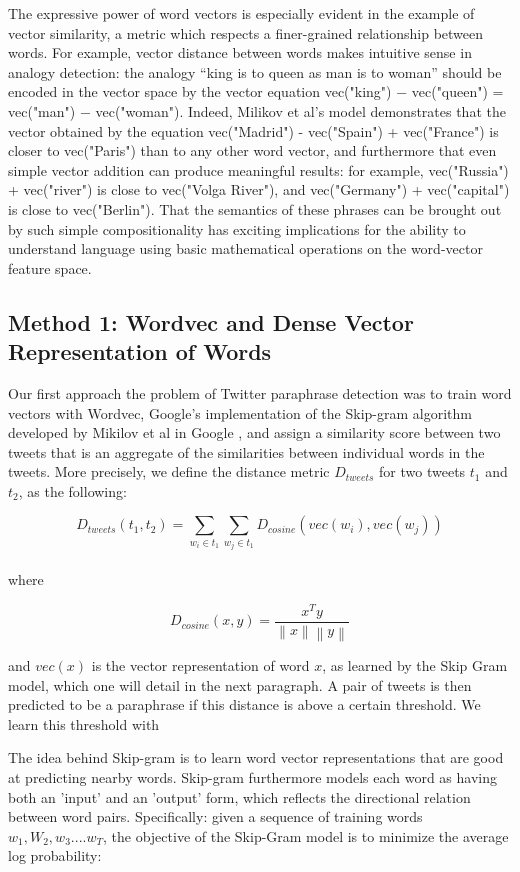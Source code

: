 \documentclass[conference]{IEEEtran}
\begin{document}
The expressive power of word vectors is especially evident in the example of vector similarity, a metric which respects a finer-grained relationship between words. For example, vector distance between words makes intuitive sense in analogy detection: the analogy “king is to queen as man is to woman” should be encoded in the vector space by the vector equation vec("king") − vec("queen") = vec("man") − vec("woman").  Indeed, Milikov et al's model demonstrates that the vector obtained by the equation vec("Madrid") - vec("Spain") + vec("France") is closer to vec("Paris") than to any other word vector, and furthermore that even simple vector addition can produce meaningful results: for example, vec("Russia") + vec("river") is close to vec("Volga River"), and vec("Germany") + vec("capital") is close to vec("Berlin"). That the semantics of these phrases can be brought out by such simple compositionality has exciting implications for the ability to understand language using basic mathematical operations on the word-vector feature space.\\


\subsection{Method 1: Wordvec and Dense Vector Representation of Words}
Our first approach the problem of Twitter paraphrase detection was to train word vectors with Wordvec, Google's implementation of the Skip-gram algorithm developed by Mikilov et al in Google \cite{Mikolov}, and assign a similarity score between two tweets that is an aggregate of the similarities between individual words in the tweets.  More precisely, we define the distance metric $D_{tweets}$ for two tweets $t_1$ and $t_2$, as the following:

$$D_{tweets}(t_1, t_2) = \sum_{w_i \in t_1} \sum_{w_j \in t_1} D_{cosine}(vec(w_i), vec(w_j))$$\\

where

$$D_{cosine}(x, y) = \frac{x^Ty}{\left \| x \right \| \left \|y \right \|}$$

and $vec(x)$ is the vector representation of word $x$, as learned by the Skip Gram model, which one will detail in the next paragraph.  A pair of tweets is then predicted to be a paraphrase if this distance is above a certain threshold.  We learn this threshold with 

The idea behind Skip-gram is to learn word vector representations that are good at predicting nearby words.  Skip-gram furthermore models each word as having both an 'input' and an 'output' form, which reflects the directional relation between word pairs.  Specifically: given a sequence of training words $w_1, W_2, w_3 .... w_T$, the objective of the Skip-Gram model is to minimize the average log probability:
\end{document}
